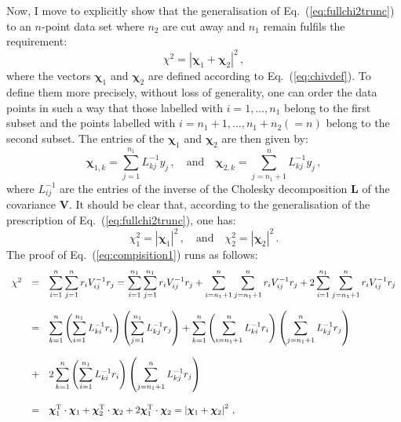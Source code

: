 \documentclass[10pt,a4paper]{article}
\begin{document}
Now, I move to explicitly show that the generalisation of
Eq.~(\ref{eq:fullchi2trunc}) to an $n$-point data set where $n_2$ are
cut away and $n_1$ remain fulfils the requirement:
\begin{equation}\label{eq:compisition1}
  \chi^2 = \left|{\bm \chi}_1+{\bm \chi}_2\right|^2\,,
\end{equation}
where the vectors ${\bm \chi}_1$ and ${\bm \chi}_2$ are defined
according to Eq.~(\ref{eq:chivdef}). To define them more precisely,
without loss of generality, one can order the data points in such a
way that those labelled with $i=1,\dots,n_1$ belong to the first
subset and the points labelled with $i=n_1+1,\dots,n_1+n_2(=n)$ belong
to the second subset. The entries of the ${\bm \chi}_1$ and ${\bm \chi}_2$ are then given by:
\begin{equation}
\bm \chi_{1,k} = \sum_{j=1}^{n_1} L_{kj}^{-1}y_j\,,\quad\mbox{and}\quad
\bm \chi_{2,k} = \sum_{j=n_1+1}^{n} L_{kj}^{-1}y_j\,,
\end{equation}
where $L_{ij}^{-1}$ are the entries of the inverse of the Cholesky
decomposition $\mathbf{L}$ of the covariance $\mathbf{V}$. It should
be clear that, according to the generalisation of the prescription of
Eq.~(\ref{eq:fullchi2trunc}), one has:
\begin{equation}
\chi_1^2= \left|\bm \chi_{1}\right|^2\,,\quad\mbox{and}\quad \chi_2^2= \left|\bm \chi_{2}\right|^2\,.
\end{equation}
The proof of Eq.~(\ref{eq:compisition1}) runs as follows:
\begin{equation}\label{eq:combinechi2s}
\begin{array}{rcl}
  \chi^2 &=&\displaystyle 
             \sum_{i=1}^n\sum_{j=1}^nr_iV_{ij}^{-1}r_j=\sum_{i=1}^{n_1}\sum_{j=1}^{n_1}r_iV_{ij}^{-1}r_j
             + \sum_{i=n_1+1}^{n}\sum_{j=n_1+1}^{n}r_iV_{ij}^{-1}r_j+2
             \sum_{i=1}^{n_1}\sum_{j=n_1+1}^{n}r_iV_{ij}^{-1}r_j\\
  \\
         &=& \displaystyle \sum_{k=1}^{n}\left(\sum_{i=1}^{n_1}L^{-1}_{ki}r_i\right)\left(\sum_{j=1}^{n_1}L^{-1}_{kj}r_j\right)
             +
             \sum_{k=1}^{n}\left(\sum_{i=n_1+1}^{n}L^{-1}_{ki}r_i\right)\left(\sum_{j=n_1+1}^{n}L^{-1}_{kj}r_j\right)\\
\\
 &+&\displaystyle 2
             \sum_{k=1}^n\left(\sum_{i=1}^{n_1}L_{ki}^{-1}r_i\right)\left(\sum_{j=n_1+1}^{n}L_{kj}^{-1}r_j\right)\\
  \\
         &=&\displaystyle {\bm \chi}_1^{\rm T}\cdot{\bm \chi}_1+{\bm \chi}_2^{\rm T}\cdot{\bm \chi}_2 +2
             {\bm \chi}_1^{\rm T}\cdot{\bm \chi}_2 =\left|{\bm \chi}_1+{\bm \chi}_2\right|^2\,,
\end{array}
\end{equation}
\end{document}
